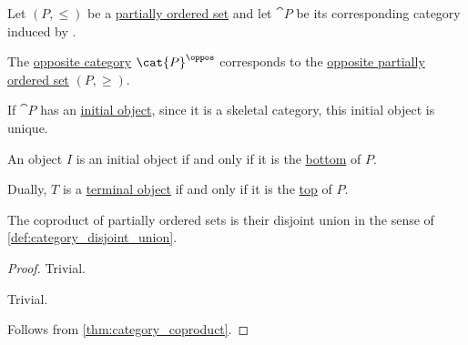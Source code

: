 \begin{proposition}\label{thm:order_category_isomorphism_properties}
  Let \( (P, \leq) \) be a \hyperref[def:partially_ordered_set]{partially ordered set} and let \( \cat{P} \) be its corresponding category induced by .

  \begin{thmenum}
     The \hyperref[def:opposite_category]{opposite category} \( \cat{P}^\oppos \) corresponds to the \hyperref[thm:order_duality]{opposite partially ordered set} \( (P, \geq) \).

     If \( \cat{P} \) has an \hyperref[def:universal_objects/initial]{initial object}, since it is a skeletal category, this initial object is unique.

    An object \( I \) is an initial object if and only if it is the \hyperref[def:extremal_points/top_and_bottom]{bottom} of \( P \).

    Dually, \( T \) is a \hyperref[def:universal_objects/terminal]{terminal object} if and only if it is the \hyperref[def:extremal_points/top_and_bottom]{top} of \( P \).

     The coproduct of partially ordered sets is their disjoint union in the sense of \cref{def:category_disjoint_union}.
  \end{thmenum}
\end{proposition}
\begin{proof}
   Trivial.

   Trivial.

   Follows from \cref{thm:category_coproduct}.
\end{proof}
